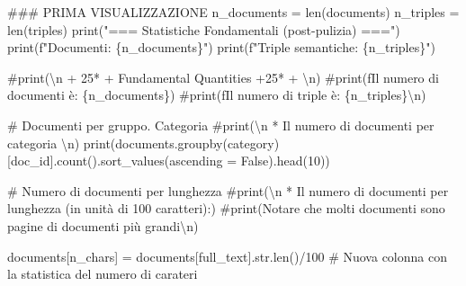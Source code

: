 \documentclass[
  italian,
  a4paper,
]{article}
\newenvironment{Shaded}{\begin{snugshade}}{\end{snugshade}}
\newcommand{\BuiltInTok}[1]{\textcolor[rgb]{0.00,0.23,0.31}{#1}}
\newcommand{\CommentTok}[1]{\textcolor[rgb]{0.37,0.37,0.37}{#1}}
\newcommand{\DecValTok}[1]{\textcolor[rgb]{0.68,0.00,0.00}{#1}}
\newcommand{\NormalTok}[1]{\textcolor[rgb]{0.00,0.23,0.31}{#1}}
\newcommand{\OperatorTok}[1]{\textcolor[rgb]{0.37,0.37,0.37}{#1}}
\newcommand{\SpecialCharTok}[1]{\textcolor[rgb]{0.37,0.37,0.37}{#1}}
\newcommand{\SpecialStringTok}[1]{\textcolor[rgb]{0.13,0.47,0.30}{#1}}
\newcommand{\StringTok}[1]{\textcolor[rgb]{0.13,0.47,0.30}{#1}}
\newcommand{\VariableTok}[1]{\textcolor[rgb]{0.07,0.07,0.07}{#1}}
\begin{document}
\begin{Shaded}
\begin{Highlighting}[]
\CommentTok{\#\#\# PRIMA VISUALIZZAZIONE}
\NormalTok{n\_documents }\OperatorTok{=} \BuiltInTok{len}\NormalTok{(documents)}
\NormalTok{n\_triples }\OperatorTok{=} \BuiltInTok{len}\NormalTok{(triples)}
\BuiltInTok{print}\NormalTok{(}\StringTok{"=== Statistiche Fondamentali (post{-}pulizia) ==="}\NormalTok{)}
\BuiltInTok{print}\NormalTok{(}\SpecialStringTok{f"Documenti:          }\SpecialCharTok{\{}\NormalTok{n\_documents}\SpecialCharTok{\}}\SpecialStringTok{"}\NormalTok{)}
\BuiltInTok{print}\NormalTok{(}\SpecialStringTok{f"Triple semantiche:  }\SpecialCharTok{\{}\NormalTok{n\_triples}\SpecialCharTok{\}}\SpecialStringTok{"}\NormalTok{)}

\CommentTok{\#print(\textquotesingle{}\textbackslash{}n\textquotesingle{} + 25*\textquotesingle{}{-}\textquotesingle{} +\textquotesingle{} Fundamental Quantities\textquotesingle{} +25*\textquotesingle{}{-}\textquotesingle{}  + \textquotesingle{}\textbackslash{}n\textquotesingle{})}
\CommentTok{\#print(f\textquotesingle{}Il numero di documenti è: \{n\_documents\}\textquotesingle{})}
\CommentTok{\#print(f\textquotesingle{}Il numero di triple è: \{n\_triples\}\textbackslash{}n\textquotesingle{})}

\CommentTok{\# Documenti per gruppo. Categoria}
\CommentTok{\#print(\textquotesingle{}\textbackslash{}n * Il  numero di documenti per categoria \textbackslash{}n\textquotesingle{})}
\BuiltInTok{print}\NormalTok{(documents.groupby(}\StringTok{\textquotesingle{}category\textquotesingle{}}\NormalTok{)[}\StringTok{\textquotesingle{}doc\_id\textquotesingle{}}\NormalTok{].count().sort\_values(ascending }\OperatorTok{=} \VariableTok{False}\NormalTok{).head(}\DecValTok{10}\NormalTok{))}

\CommentTok{\# Numero di documenti per lunghezza}
\CommentTok{\#print(\textquotesingle{}\textbackslash{}n * Il numero di documenti per lunghezza (in unità di 100 caratteri):\textquotesingle{})}
\CommentTok{\#print(\textquotesingle{}Notare che molti documenti sono pagine di documenti più grandi\textbackslash{}n\textquotesingle{})}

\NormalTok{documents[}\StringTok{\textquotesingle{}n\_chars\textquotesingle{}}\NormalTok{] }\OperatorTok{=}\NormalTok{ documents[}\StringTok{\textquotesingle{}full\_text\textquotesingle{}}\NormalTok{].}\BuiltInTok{str}\NormalTok{.}\BuiltInTok{len}\NormalTok{()}\OperatorTok{/}\DecValTok{100} \CommentTok{\# Nuova colonna con la statistica del numero di carateri }


\end{Highlighting}
\end{Shaded}
\end{document}
